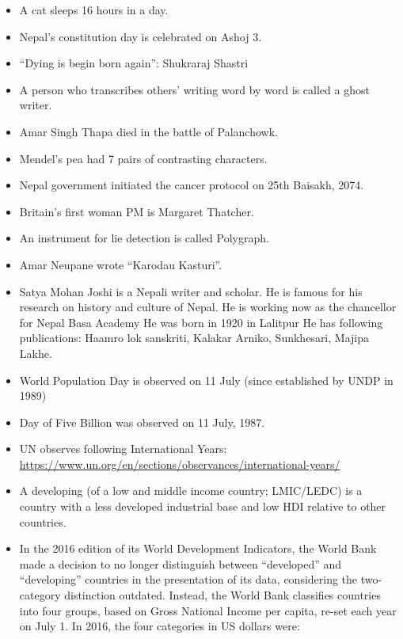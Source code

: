 \documentclass[]{book}
\begin{document}
\begin{itemize}
\item
  A cat sleeps 16 hours in a day.
\item
  Nepal's constitution day is celebrated on Ashoj 3.
\item
  ``Dying is begin born again'': Shukraraj Shastri
\item
  A person who transcribes others' writing word by word is called a ghost writer.
\item
  Amar Singh Thapa died in the battle of Palanchowk.
\item
  Mendel's pea had 7 pairs of contrasting characters.
\item
  Nepal government initiated the cancer protocol on 25th Baisakh, 2074.
\item
  Britain's first woman PM is Margaret Thatcher.
\item
  An instrument for lie detection is called Polygraph.
\item
  Amar Neupane wrote ``Karodau Kasturi''.
\item
  Satya Mohan Joshi is a Nepali writer and scholar.
  He is famous for his research on history and culture of Nepal.
  He is working now as the chancellor for Nepal Basa Academy
  He was born in 1920 in Lalitpur
  He has following publications: Haamro lok sanskriti, Kalakar Arniko, Sunkhesari, Majipa Lakhe.
\item
  World Population Day is observed on 11 July (since established by UNDP in 1989)
\item
  Day of Five Billion was observed on 11 July, 1987.
\item
  UN observes following International Years: \url{https://www.un.org/en/sections/observances/international-years/}
\item
  A developing (of a low and middle income country; LMIC/LEDC) is a country with a less developed industrial base and low HDI relative to other countries.
\item
  In the 2016 edition of its World Development Indicators, the World Bank made a decision to no longer distinguish between ``developed'' and ``developing'' countries in the presentation of its data, considering the two-category distinction outdated. Instead, the World Bank classifies countries into four groups, based on Gross National Income per capita, re-set each year on July 1. In 2016, the four categories in US dollars were:


\end{itemize}
\end{document}
